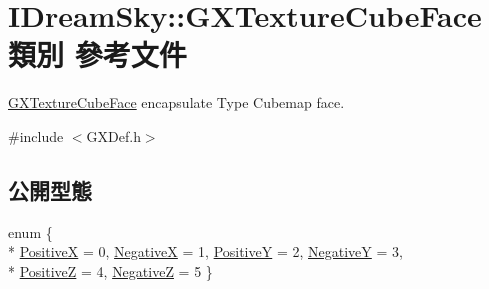 \hypertarget{class_i_dream_sky_1_1_g_x_texture_cube_face}{}\section{I\+Dream\+Sky\+:\+:G\+X\+Texture\+Cube\+Face 類別 參考文件}
\label{class_i_dream_sky_1_1_g_x_texture_cube_face}


\hyperlink{class_i_dream_sky_1_1_g_x_texture_cube_face}{G\+X\+Texture\+Cube\+Face} encapsulate Type Cubemap face.  




{\ttfamily \#include $<$G\+X\+Def.\+h$>$}

\subsection*{公開型態}
\begin{DoxyCompactItemize}
\item 
enum \{ \\*
\hyperlink{class_i_dream_sky_1_1_g_x_texture_cube_face_a31aed368f1e0cb4c7dca4b26e09244bda67fe45a53d4d12eff22869b31c839db8}{PositiveX} = 0, 
\hyperlink{class_i_dream_sky_1_1_g_x_texture_cube_face_a31aed368f1e0cb4c7dca4b26e09244bda096e0279ec4f982fb4b58fee761658ba}{NegativeX} = 1, 
\hyperlink{class_i_dream_sky_1_1_g_x_texture_cube_face_a31aed368f1e0cb4c7dca4b26e09244bdac9f579db982518779df0c2fc2ae603ca}{PositiveY} = 2, 
\hyperlink{class_i_dream_sky_1_1_g_x_texture_cube_face_a31aed368f1e0cb4c7dca4b26e09244bda8c08835422b8322218dab1783316db43}{NegativeY} = 3, 
\\*
\hyperlink{class_i_dream_sky_1_1_g_x_texture_cube_face_a31aed368f1e0cb4c7dca4b26e09244bda2bcfb5b9c382708248101557c0f50c12}{PositiveZ} = 4, 
\hyperlink{class_i_dream_sky_1_1_g_x_texture_cube_face_a31aed368f1e0cb4c7dca4b26e09244bda7d52f4c5c364c359c2f2a53eafb813df}{NegativeZ} = 5
 \}
\end{DoxyCompactItemize}
